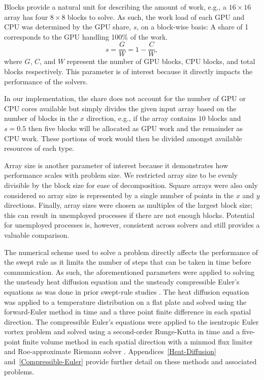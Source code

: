 \documentclass[preprints,article,accept,moreauthors,pdftex]{Definitions/mdpi}
\begin{document}
\par
Blocks provide a natural unit for describing the amount of work, e.g., a $16\times16$ array has four $8\times8$ blocks to solve. As such, the work load of each GPU and CPU was determined by the GPU share, $s$, on a block-wise basis: A share of 1 corresponds to the GPU handling 100\% of the work.  
\begin{equation}
    \label{share-equation}
    s = \frac{G}{W} = 1-\frac{C}{W},
\end{equation}
where $G$, $C$, and $W$ represent the number of GPU blocks, CPU blocks, and total blocks respectively. This parameter is of interest because it directly impacts the performance of the solvers.

In our implementation, the share does not account for the number of GPU or CPU cores available but simply divides the given input array based on the number of blocks in the $x$ direction, e.g., if the array contains $10$ blocks and $s=0.5$ then five blocks will be allocated as GPU work and the remainder as CPU work. These portions of work would then be divided amongst available resources of each type. 
\par
Array size is another parameter of interest because it demonstrates how performance scales with problem size. We restricted array size to be evenly divisible by the block size for ease of decomposition. Square arrays were also only considered so array size is represented by a single number of points in the $x$ and $y$ directions. Finally, array sizes were chosen as multiples of the largest block size; this can result in unemployed processes if there are not enough blocks. Potential for unemployed processes is, however, consistent across solvers and still provides a valuable comparison.

\par
The numerical scheme used to solve a problem directly affects the performance of the swept rule as it limits the number of steps that can be taken in time before communication. As such, the aforementioned parameters were applied to solving the unsteady heat diffusion equation and the unsteady compressible Euler's equations as was done in prior swept-rule studies \cite{Alhubail2016ThePDEs,Alhubail2018ThePDEs,Magee2018AcceleratingDecomposition, Magee2020ApplyingSystems}. The heat diffusion equation was applied to a temperature distribution on a flat plate and solved using the forward-Euler method in time and a three point finite difference in each spatial direction. The compressible Euler's equations were applied to the isentropic Euler vortex problem and solved using a second-order Runge-Kutta in time and a five-point finite volume method in each spatial direction with a minmod flux limiter and Roe-approximate Riemann solver \cite{SpiegelAMethods,Leveque2002FiniteProblems}. Appendices~\ref{Heat-Diffusion} and~\ref{Compressible-Euler} provide further detail on these methods and associated problems.
\end{document}
